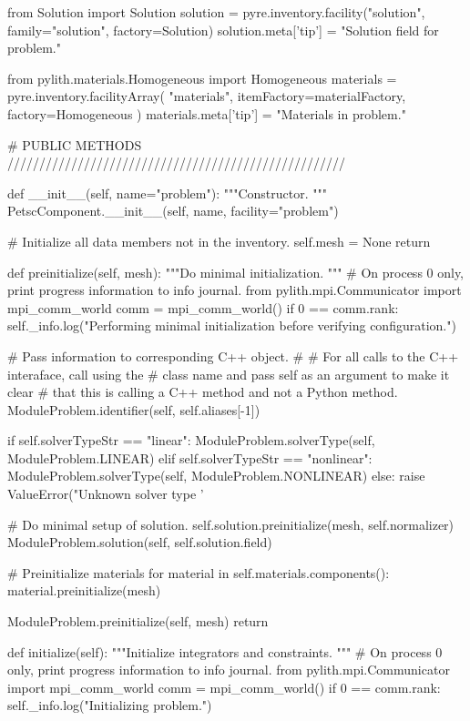 \begin{python}
    from Solution import Solution
    solution = pyre.inventory.facility("solution", family="solution", factory=Solution)
    solution.meta['tip'] = "Solution field for problem."

    from pylith.materials.Homogeneous import Homogeneous
    materials = pyre.inventory.facilityArray(
        "materials",
        itemFactory=materialFactory,
        factory=Homogeneous
    )
    materials.meta['tip'] = "Materials in problem."

        
    # PUBLIC METHODS /////////////////////////////////////////////////////

    def __init__(self, name="problem"):
        """Constructor.
        """
        PetscComponent.__init__(self, name, facility="problem")

        # Initialize all data members not in the inventory.
        self.mesh = None
        return

    def preinitialize(self, mesh):
        """Do minimal initialization.
        """
        # On process 0 only, print progress information to info journal.
        from pylith.mpi.Communicator import mpi_comm_world
        comm = mpi_comm_world()
        if 0 == comm.rank:
            self._info.log("Performing minimal initialization before verifying configuration.")

        # Pass information to corresponding C++ object.
        #
        # For all calls to the C++ interaface, call using the
        # class name and pass self as an argument to make it clear
        # that this is calling a C++ method and not a Python method.
        ModuleProblem.identifier(self, self.aliases[-1])

        if self.solverTypeStr == "linear":
            ModuleProblem.solverType(self, ModuleProblem.LINEAR)
        elif self.solverTypeStr == "nonlinear":
            ModuleProblem.solverType(self, ModuleProblem.NONLINEAR)
        else:
            raise ValueError("Unknown solver type '%

        # Do minimal setup of solution.
        self.solution.preinitialize(mesh, self.normalizer)
        ModuleProblem.solution(self, self.solution.field)

        # Preinitialize materials
        for material in self.materials.components():
            material.preinitialize(mesh)

        ModuleProblem.preinitialize(self, mesh)
        return

    def initialize(self):
        """Initialize integrators and constraints.
        """
        # On process 0 only, print progress information to info journal.
        from pylith.mpi.Communicator import mpi_comm_world
        comm = mpi_comm_world()
        if 0 == comm.rank:
            self._info.log("Initializing problem.")


\end{python}
